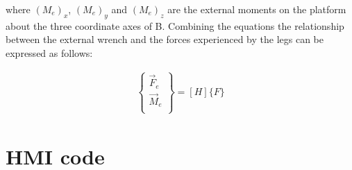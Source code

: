 where $(M_e)_x$, $(M_e)_y$ and $(M_e)_z$ are the external moments on the platform  about the three coordinate axes of B. Combining the equations the relationship between the external wrench and the forces experienced by the legs can be expressed as follows:
\begin{ceqn}
\begin{align}
	\begin{Bmatrix}
		\vec{F}_e \\
		\vec{M}_e \\
	\end{Bmatrix} = [H]\{F\}
\end{align}
\end{ceqn}
\clearpage
\section{HMI code}
